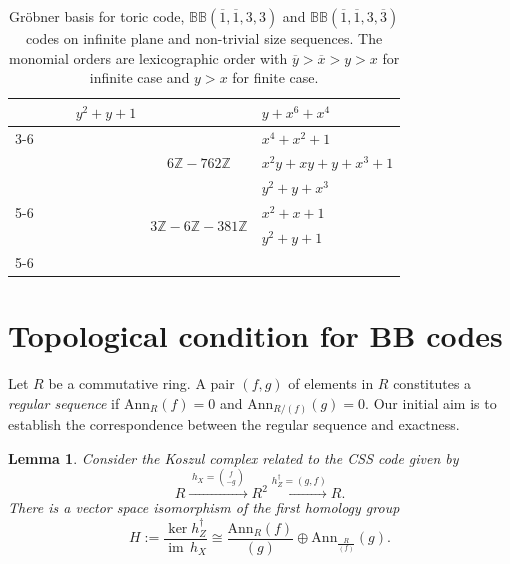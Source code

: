 \documentclass[aps,prl,english,superscriptaddress,twocolumn,tightenlines,showpacs,longbibliography,floatfix,amsfonts]{revtex4-2}
\newtheorem{lem}{Lemma}
\newcommand{\im}[1]{{\operatorname{im} \, #1}}
\begin{document}
\begin{table}[]
\begin{tabular}{clcl|c|l|}
		& \multicolumn{1}{l|}{} & \multicolumn{1}{c|}{} & $y^2+y+1$ &  & $y+x^6+x^4$ \\ \cline{3-6} 
		&  &  &  & \multirow{3}{*}{$6\mathbb{Z}-762\mathbb{Z}$} & $x^4+x^2+1$ \\
		&  &  &  &  & $x^2y+xy+y+x^3+1$ \\
		&  &  &  &  & $y^2+y+x^3$ \\ \cline{5-6} 
		&  &  &  & \multirow{2}{*}{$3\mathbb{Z}-6\mathbb{Z}-381\mathbb{Z}$} & $x^2+x+1$ \\
		&  &  &  &  & $y^2+y+1$ \\ \cline{5-6} 
	\end{tabular}
	\caption{Gr\"obner basis for toric code, $\mathbb{BB}(\overline{1},\overline{1},3,3)$ and $\mathbb{BB}(\overline{1},\overline{1},3,\overline{3})$ codes on infinite plane and non-trivial size sequences. The monomial orders are lexicographic order with $\overline{y}>\overline{x}>y>x$ for infinite case and $y>x$ for finite case.}\label{table:groebner_basis}
\end{table}

\section{Topological condition for BB codes}
Let $R$ be a commutative ring. A pair $(f,g)$ of elements in $R$ constitutes a \textit{regular sequence} if $\mathrm{Ann}_R(f)=0$ and $\mathrm{Ann}_{R/(f)}(g)=0$. Our initial aim is to establish the correspondence between the regular sequence and exactness. 
\begin{lem}
	Consider the Koszul complex related to the CSS code given by
	\begin{equation}
		R\xrightarrow{\;h_X={f \choose -g}\;}R^{2}\xrightarrow{h_Z^\dagger=\left(g,f\right)}R.
	\end{equation}
	There is a vector space isomorphism of the first homology group
	\begin{equation}
		H := \frac{\ker h_Z^\dagger}{\im h_X} \cong \frac{\mathrm{Ann}_R(f)}{(g)} \oplus \mathrm{Ann}_{\frac{R}{(f)}}(g).
	\end{equation}
\end{lem}
\end{document}
